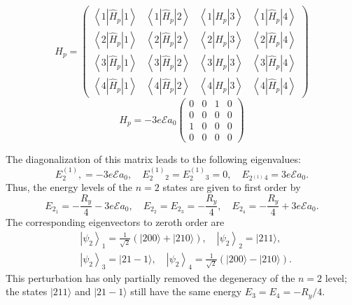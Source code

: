 $$
H_{p}=\left(\begin{array}{ccccc}
\left\langle 1\left|\hat{H}_{p}\right| 1\right\rangle & \left\langle 1\left|\hat{H}_{p}\right| 2\right\rangle & \left\langle 1\left|\hat{H}_{p}\right| 3\right\rangle & \left\langle 1\left|\hat{H}_{p}\right| 4\right\rangle \\
\left\langle 2\left|\hat{H}_{p}\right| 1\right\rangle & \left\langle 2\left|\hat{H}_{p}\right| 2\right\rangle & \left\langle 2\left|\hat{H}_{p}\right| 3\right\rangle & \left\langle 2\left|\hat{H}_{p}\right| 4\right\rangle \\
\left\langle 3\left|\hat{H}_{p}\right| 1\right\rangle & \left\langle 3\left|\hat{H}_{p}\right| 2\right\rangle & \left\langle 3\left|\hat{H}_{p}\right| 3\right\rangle & \left\langle 3\left|\hat{H}_{p}\right| 4\right\rangle \\
\left\langle 4\left|\hat{H}_{p}\right| 1\right\rangle & \left\langle 4\left|\hat{H}_{p}\right| 2\right\rangle & \left\langle 4\left|\hat{H}_{p}\right| 3\right\rangle & \left\langle 4\left|\hat{H}_{p}\right| 4\right\rangle
\end{array}\right)
$$
$$H_{p}=-3 e \mathcal{E} a_{0}\left(\begin{array}{cccc}
	0 & 0 & 1 & 0 \\
	0 & 0 & 0 & 0 \\
	1 & 0 & 0 & 0 \\
	0 & 0 & 0 & 0
\end{array}\right)$$

The diagonalization of this matrix leads to the following eigenvalues:
$$
E_{2}^{(1)},=-3 e \mathcal{E} a_{0}, \quad E_{2}^{(1)}{ }_{2}=E_{2}^{(1)}{ }_{3}=0, \quad E_{2{ }^{(1)}}{ }_{4}=3 e \mathcal{E} a_{0} .
$$
Thus, the energy levels of the $n=2$ states are given to first order by
$$
E_{2_{1}}=-\frac{R_{y}}{4}-3 e \mathcal{E} a_{0}, \quad E_{2_{2}}=E_{2_{3}}=-\frac{R_{y}}{4}, \quad E_{2_{4}}=-\frac{R_{y}}{4}+3 e \mathcal{E} a_{0} .
$$
The corresponding eigenvectors to zeroth order are
$$
\begin{aligned}
&\left|\psi_{2}\right\rangle_{1}=\frac{1}{\sqrt{2}}(|200\rangle+|210\rangle), \quad\left|\psi_{2}\right\rangle_{2}=|211\rangle, \\
&\left|\psi_{2}\right\rangle_{3}=|21-1\rangle, \quad\left|\psi_{2}\right\rangle_{4}=\frac{1}{\sqrt{2}}(|200\rangle-|210\rangle) .
\end{aligned}
$$
This perturbation has only partially removed the degeneracy of the $n=2$ level; the states $|211\rangle$ and $|21-1\rangle$ still have the same energy $E_{3}=E_{4}=-R_{y} / 4$.

